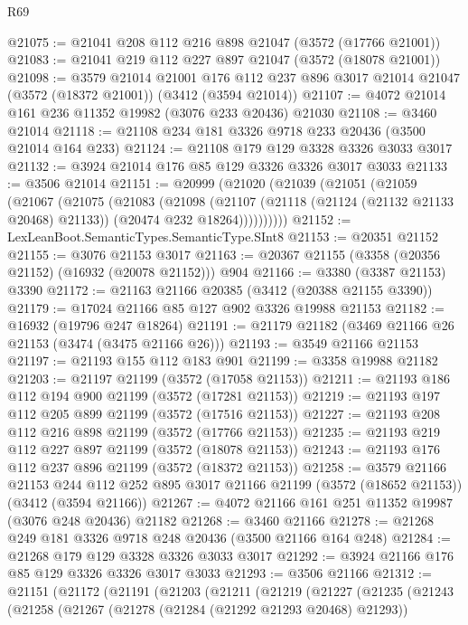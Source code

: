 \begin{lexlean}{R69}
\begin{coremodule}
@21075 := @21041 @208 @112 @216 @898 @21047 (@3572 (@17766 @21001))
@21083 := @21041 @219 @112 @227 @897 @21047 (@3572 (@18078 @21001))
@21098 := @3579
    @21014
    @21001
    @176
    @112
    @237
    @896
    @3017
    @21014
    @21047
    (@3572 (@18372 @21001))
    (@3412 (@3594 @21014))
@21107 := @4072 @21014 @161 @236 @11352 @19982 (@3076 @233 @20436) @21030
@21108 := @3460 @21014
@21118 := @21108 @234 @181 @3326 @9718 @233 @20436 (@3500 @21014 @164 @233)
@21124 := @21108 @179 @129 @3328 @3326 @3033 @3017
@21132 := @3924 @21014 @176 @85 @129 @3326 @3326 @3017 @3033
@21133 := @3506 @21014
@21151 := @20999
    (@21020
      (@21039
        (@21051
          (@21059
            (@21067
              (@21075
                (@21083
                  (@21098
                    (@21107
                      (@21118 (@21124 (@21132 @21133 @20468) @21133))
                      (@20474 @232 @18264))))))))))
@21152 := LexLeanBoot.SemanticTypes.SemanticType.SInt8
@21153 := @20351 @21152
@21155 := @3076 @21153 @3017
@21163 := @20367 @21155 (@3358 (@20356 @21152) (@16932 (@20078 @21152))) @904
@21166 := @3380 (@3387 @21153) @3390
@21172 := @21163 @21166 @20385 (@3412 (@20388 @21155 @3390))
@21179 := @17024 @21166 @85 @127 @902 @3326 @19988 @21153
@21182 := @16932 (@19796 @247 @18264)
@21191 := @21179 @21182 (@3469 @21166 @26 @21153 (@3474 (@3475 @21166 @26)))
@21193 := @3549 @21166 @21153
@21197 := @21193 @155 @112 @183 @901
@21199 := @3358 @19988 @21182
@21203 := @21197 @21199 (@3572 (@17058 @21153))
@21211 := @21193 @186 @112 @194 @900 @21199 (@3572 (@17281 @21153))
@21219 := @21193 @197 @112 @205 @899 @21199 (@3572 (@17516 @21153))
@21227 := @21193 @208 @112 @216 @898 @21199 (@3572 (@17766 @21153))
@21235 := @21193 @219 @112 @227 @897 @21199 (@3572 (@18078 @21153))
@21243 := @21193 @176 @112 @237 @896 @21199 (@3572 (@18372 @21153))
@21258 := @3579
    @21166
    @21153
    @244
    @112
    @252
    @895
    @3017
    @21166
    @21199
    (@3572 (@18652 @21153))
    (@3412 (@3594 @21166))
@21267 := @4072 @21166 @161 @251 @11352 @19987 (@3076 @248 @20436) @21182
@21268 := @3460 @21166
@21278 := @21268 @249 @181 @3326 @9718 @248 @20436 (@3500 @21166 @164 @248)
@21284 := @21268 @179 @129 @3328 @3326 @3033 @3017
@21292 := @3924 @21166 @176 @85 @129 @3326 @3326 @3017 @3033
@21293 := @3506 @21166
@21312 := @21151
    (@21172
      (@21191
        (@21203
          (@21211
            (@21219
              (@21227
                (@21235
                  (@21243
                    (@21258
                      (@21267
                        (@21278 (@21284 (@21292 @21293 @20468) @21293))

\end{coremodule}
\end{lexlean}
